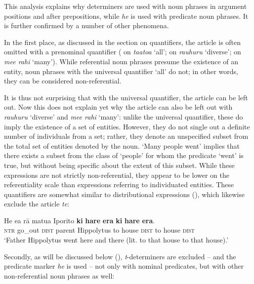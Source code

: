 This analysis explains why determiners are used with noun phrases in argument positions and after prepositions, while \textit{he} is used with predicate noun phrases. It is further confirmed by a number of other phenomena.

In the first place, as discussed in the section on quantifiers, the article is often omitted with a prenominal quantifier ( on \textit{ta}\textit{{\ꞌ}ato{\ꞌ}a} ‘all’;  on \textit{rauhuru} ‘diverse’;  on \textit{me}\textit{{\ꞌ}e rahi} ‘many’). While referential noun phrases presume the existence of an entity, noun phrases with the universal quantifier ‘all’ do not; in other words, they can be considered non-referential. 

It is thus not surprising that with the universal quantifier, the article can be left out. Now this does not explain yet why the article can also be left out with \textit{rauhuru} ‘diverse’ and \textit{me{\ꞌ}e rahi} ‘many’: unlike the universal quantifier, these do imply the existence of a set of entities. However, they do not single out a definite number of individuals from a set; rather, they denote an unspecified subset from the total set of entities denoted by the noun. ‘Many people went’ implies that there exists a subset from the class of ‘people’ for whom the predicate ‘went’ is true, but without being specific about the extent of this subset. While these expressions are not strictly non-referential, they appear to be lower on the referentiality scale than expressions referring to individuated entities. These quantifiers are somewhat similar to distributional expressions (), which likewise exclude the article \textit{te}:

\ea\label{ex:5.38}
\gll He e{\ꞌ}a rā matu{\ꞌ}a Iporito \textbf{ki} \textbf{hare} \textbf{era} \textbf{ki} \textbf{hare} \textbf{era}. \\
\textsc{ntr} go\_out \textsc{dist} parent Hippolytus to house \textsc{dist} to house \textsc{dist} \\

\glt 
‘Father Hippolytus went here and there (lit. to that house to that house).’ \textstyleExampleref{[R231.282]} 
\z

Secondly, as will be discussed below (), \textit{t}{}-determiners are excluded – and the predicate marker \textit{he} is used – not only with nominal predicates, but with other non-referential noun phrases as well: 

